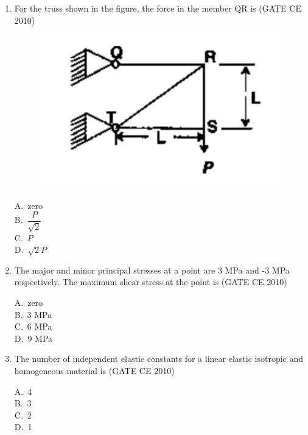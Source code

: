 \documentclass[journal,12pt,onecolumn]{exam}
\theoremstyle{remark}
\begin{document}
\begin{enumerate}
\noindent\item For the truss shown in the figure, the force in the member QR is \hfill{(GATE CE 2010)}
\begin{figure}[H]
    \centering
    \includegraphics[scale=0.5]{figs/image1.jpg}
    \caption{}
    \label{fig:figure1}
\end{figure}
\begin{multicols}{4}
A.\ zero \\
B.\ $\dfrac{P}{\sqrt{2}}$ \\
C.\ $P$ \\
D.\ $\sqrt{2}P$
\end{multicols}

\noindent\item The major and minor principal stresses at a point are 3 MPa and -3 MPa respectively. The maximum shear stress at the point is \hfill{(GATE CE 2010)}
\begin{multicols}{4}
A.\ zero \\
B.\ 3 MPa \\
C.\ 6 MPa \\
D.\ 9 MPa
\end{multicols}

\noindent\item  The number of independent elastic constants for a linear elastic isotropic and homogeneous material is \hfill{(GATE CE 2010)}
\begin{multicols}{4}
A.\ 4 \\
B.\ 3 \\
C.\ 2 \\
D.\ 1
\end{multicols}


\end{enumerate}
\end{document}
